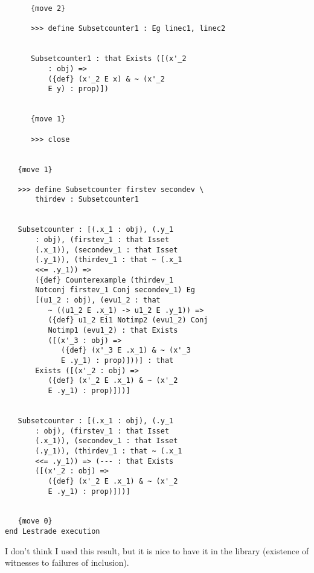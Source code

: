 \documentclass[12pt]{article}
\begin{document}
\begin{verbatim}
      {move 2}

      >>> define Subsetcounter1 : Eg linec1, linec2


      Subsetcounter1 : that Exists ([(x'_2 
          : obj) => 
          ({def} (x'_2 E x) & ~ (x'_2 
          E y) : prop)])


      {move 1}

      >>> close


   {move 1}

   >>> define Subsetcounter firstev secondev \
       thirdev : Subsetcounter1


   Subsetcounter : [(.x_1 : obj), (.y_1 
       : obj), (firstev_1 : that Isset 
       (.x_1)), (secondev_1 : that Isset 
       (.y_1)), (thirdev_1 : that ~ (.x_1 
       <<= .y_1)) => 
       ({def} Counterexample (thirdev_1 
       Notconj firstev_1 Conj secondev_1) Eg 
       [(u1_2 : obj), (evu1_2 : that 
          ~ ((u1_2 E .x_1) -> u1_2 E .y_1)) => 
          ({def} u1_2 Ei1 Notimp2 (evu1_2) Conj 
          Notimp1 (evu1_2) : that Exists 
          ([(x'_3 : obj) => 
             ({def} (x'_3 E .x_1) & ~ (x'_3 
             E .y_1) : prop)]))] : that 
       Exists ([(x'_2 : obj) => 
          ({def} (x'_2 E .x_1) & ~ (x'_2 
          E .y_1) : prop)]))]


   Subsetcounter : [(.x_1 : obj), (.y_1 
       : obj), (firstev_1 : that Isset 
       (.x_1)), (secondev_1 : that Isset 
       (.y_1)), (thirdev_1 : that ~ (.x_1 
       <<= .y_1)) => (--- : that Exists 
       ([(x'_2 : obj) => 
          ({def} (x'_2 E .x_1) & ~ (x'_2 
          E .y_1) : prop)]))]


   {move 0}
end Lestrade execution
\end{verbatim}

I don't think I used this result, but it is nice to have it in the library (existence of witnesses to failures of inclusion).
\end{document}
